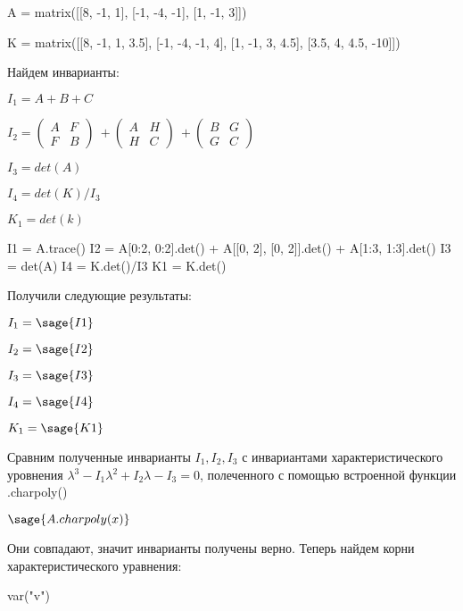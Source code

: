\documentclass{article}
\begin{document}
\begin{sageblock}
A = matrix([[8, -1, 1],
          [-1, -4, -1],
          [1, -1, 3]])

K = matrix([[8, -1, 1, 3.5],
           [-1, -4, -1, 4],
           [1, -1, 3, 4.5],
           [3.5, 4, 4.5, -10]])
\end{sageblock}

Найдем инварианты:

$I_1 = A+B+C$

$I_2 = \begin{pmatrix}
A & F\\
F & B \end{pmatrix}\
+ \begin{pmatrix}
A & H\\
H & C \end{pmatrix}\
+ \begin{pmatrix}
B & G\\
G & C \end{pmatrix}$

$I_3 = det(A)$

$I_4 = det(K)/I_3$

$K_1 = det(k)$

\begin{sageblock}
I1 = A.trace()
I2 = A[0:2, 0:2].det() + A[[0, 2], [0, 2]].det() + A[1:3, 1:3].det()
I3 = det(A)
I4 = K.det()/I3
K1 = K.det()
\end{sageblock}

Получили следующие результаты:

\begin{center}
$I_1 = \sage{I1}$

$I_2 = \sage{I2}$

$I_3 = \sage{I3}$

$I_4 = \sage{I4}$

$K_1 = \sage{K1}$

\end{center}

Сравним полученные инварианты $I_1, I_2, I_3$ с инвариантами характеристического уровнения $\lambda{^3} - I_1\lambda{^2}+I_2\lambda-I_3=0$, полеченного с помощью встроенной функции .charpoly()

$\sage{A.charpoly(x)}$

Они совпадают, значит инварианты получены верно. Теперь найдем корни характеристического уравнения:

\begin{sagesilent}
var("v")
\end{sagesilent}
\end{document}
